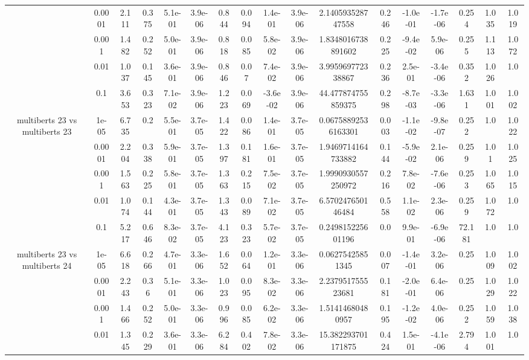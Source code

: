 \begin{tabular}{|c|c|c|c|c|c|c|c|c|c|c|c|c|c|c|c|c|}
 & 0.0001 & 2.111 & 0.375 & 5.1e-01 & 3.9e-06 & 0.844 & 0.094 & 1.4e-01 & 3.9e-06 & 2.140593528747558 & 0.246 & -1.0e-01 & -1.7e-06 & 0.254 & 1.035 & 1.019 \\
 & 0.001 & 1.482 & 0.252 & 5.0e-01 & 3.9e-06 & 0.818 & 0.085 & 5.8e-02 & 3.9e-06 & 1.8348016738891602 & 0.225 & -9.4e-02 & 5.9e-06 & 0.255 & 1.113 & 1.072 \\
 & 0.01 & 1.037 & 0.145 & 3.6e-01 & 3.9e-06 & 0.846 & 0.07 & 7.4e-02 & 3.9e-06 & 3.995969772338867 & 0.236 & 2.5e-01 & -3.4e-06 & 0.352 & 1.026 & 1.0 \\
 & 0.1 & 3.653 & 0.323 & 7.1e-02 & 3.9e-06 & 1.223 & 0.069 & -3.6e-02 & 3.9e-06 & 44.477874755859375 & 0.298 & -8.7e-03 & -3.3e-06 & 1.631 & 1.001 & 1.002 \\
\hline
\multirow{5}{*}{multiberts 23 vs multiberts 23} & 1e-05 & 6.735 & 0.2 & 5.5e-01 & 3.7e-05 & 1.422 & 0.086 & 1.4e-01 & 3.7e-05 & 0.06758892536163301 & 0.003 & -1.1e-02 & -9.8e-07 & 0.252 & 1.0 & 1.022 \\
 & 0.0001 & 2.204 & 0.338 & 5.9e-01 & 3.7e-05 & 1.397 & 0.181 & 1.6e-01 & 3.7e-05 & 1.9469714164733882 & 0.144 & -5.9e-02 & 2.1e-06 & 0.259 & 1.01 & 1.025 \\
 & 0.001 & 1.563 & 0.225 & 5.8e-01 & 3.7e-05 & 1.363 & 0.215 & 7.5e-02 & 3.7e-05 & 1.9990930557250972 & 0.216 & 7.8e-02 & -7.6e-06 & 0.253 & 1.065 & 1.015 \\
 & 0.01 & 1.074 & 0.144 & 4.3e-01 & 3.7e-05 & 1.343 & 0.089 & 7.1e-02 & 3.7e-05 & 6.570247650146484 & 0.558 & 1.1e-02 & 2.3e-06 & 0.259 & 1.072 & 1.0 \\
 & 0.1 & 5.217 & 0.646 & 8.3e-02 & 3.7e-05 & 4.123 & 0.323 & 5.7e-02 & 3.7e-05 & 0.249815225601196 & 0.0 & 9.9e-01 & -6.9e-06 & 72.181 & 1.0 & 1.0 \\
\hline
\multirow{5}{*}{multiberts 23 vs multiberts 24} & 1e-05 & 6.618 & 0.266 & 4.7e-01 & 3.3e-06 & 1.652 & 0.064 & 1.2e-01 & 3.3e-06 & 0.06275425851345 & 0.007 & -1.4e-01 & 3.2e-06 & 0.25 & 1.009 & 1.002 \\
 & 0.0001 & 2.243 & 0.36 & 5.1e-01 & 3.3e-06 & 1.023 & 0.095 & 8.3e-02 & 3.3e-06 & 2.237951755523681 & 0.181 & -2.0e-01 & 6.4e-06 & 0.25 & 1.029 & 1.022 \\
 & 0.001 & 1.466 & 0.252 & 5.0e-01 & 3.3e-06 & 0.996 & 0.085 & 6.2e-02 & 3.3e-06 & 1.51414680480957 & 0.195 & -1.2e-02 & 4.0e-06 & 0.252 & 1.059 & 1.038 \\
 & 0.01 & 1.345 & 0.229 & 3.6e-01 & 3.3e-06 & 6.284 & 0.402 & 7.8e-02 & 3.3e-06 & 15.382293701171875 & 0.424 & 1.5e-01 & -4.1e-06 & 2.794 & 1.001 & 1.0 \\

\end{tabular}
